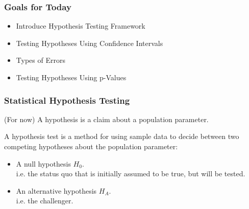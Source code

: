 \documentclass[handout]{beamer}
\newcommand{\blue}[1]{\textcolor{blue2}{#1}}
\begin{document}
\begin{frame}[fragile]
\frametitle{Goals for Today}

\begin{itemize}
\item Introduce Hypothesis Testing Framework
\item Testing Hypotheses Using Confidence Intervals
\item Types of Errors
\item Testing Hypotheses Using p-Values
\end{itemize}

\end{frame}



\begin{frame}
\frametitle{Statistical Hypothesis Testing}
(For now) A \blue{hypothesis} is a claim about a population parameter.

\vskip 0.25cm

\pause A \blue{hypothesis test} is a method for using sample data to decide between two competing hypotheses about the population parameter:
\begin{itemize}
\pause \item A \blue{null hypothesis $H_0$}.\\
i.e. the \blue{status quo} that is initially assumed to be true, but will be tested. 
\pause \item An \blue{alternative hypothesis $H_A$}.\\
i.e. the \blue{challenger}.
\end{itemize}

\end{frame}
\end{document}
